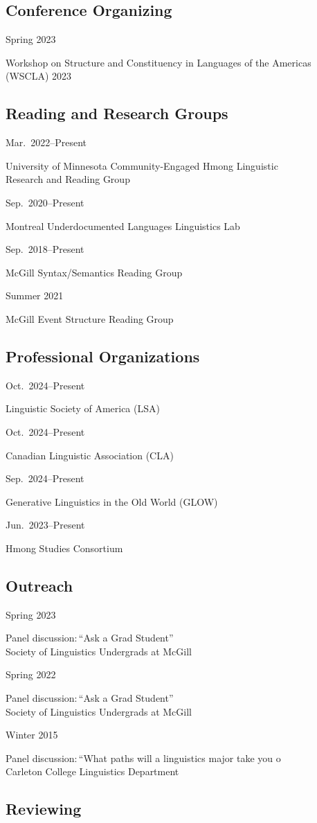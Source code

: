 \documentclass[11pt,oneside,DIV=calc,parskip=off]{scrarticle} %
\newlength{\leftcolwidth}
\newlength{\mycolspace}
\newlength{\rightcolwidth}
\newlength{\spacingbefore}
\newlength{\spacingafter}
\newcommand{\mytwocol}[2]{%
	\vspace{\spacingbefore}%
	\begin{minipage}[t]{\leftcolwidth}%
		\strut#1%
	\end{minipage}%
	\hspace{\mycolspace}%
	\begin{minipage}[t]{\rightcolwidth}%
		\strut#2%
	\end{minipage}%
	\vspace{\spacingafter}\par%
	}
\newcommand{\cvline}[2]{%
	\mytwocol{#1}{#2}%
	}
\begin{document}
\subsection{Conference Organizing}
\cvline{Spring 2023}{Workshop on Structure and Constituency in Languages of the Americas (WSCLA) 2023}

\subsection{Reading and Research Groups}

\cvline{Mar.\ 2022--Present}{University of Minnesota Community-Engaged Hmong Linguistic\rlap{s}\\Research and Reading Group}
\cvline{Sep.\ 2020--Present}{Montreal Underdocumented Languages Linguistics Lab %
}
\cvline{Sep.\ 2018--Present}{McGill Syntax/Semantics Reading Group}
\cvline{Summer 2021}{McGill Event Structure Reading Group}

\subsection{Professional Organizations}
\cvline{Oct.\ 2024--Present}{Linguistic Society of America (LSA)}
\cvline{Oct.\ 2024--Present}{Canadian Linguistic Association (CLA)}
\cvline{Sep.\ 2024--Present}{Generative Linguistics in the Old World (GLOW)}
\cvline{Jun.\ 2023--Present}{Hmong Studies Consortium}

\subsection{Outreach}
\cvline{Spring 2023}{Panel discussion:\,``Ask a Grad Student''\\Society of Linguistics Undergrads at McGill}
\cvline{Spring 2022}{Panel discussion:\,``Ask a Grad Student''\\Society of Linguistics Undergrads at McGill}
\cvline{Winter 2015}{Panel discussion:\,``What paths will a linguistics major take you o\rlap{n?''}\\Carleton College Linguistics Department}

\subsection{Reviewing}
\end{document}
